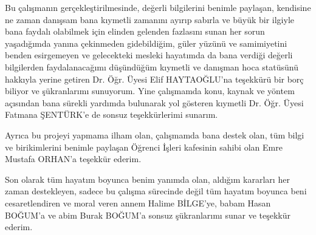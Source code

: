 Bu çalışmanın gerçekleştirilmesinde, değerli bilgilerini benimle paylaşan, kendisine ne zaman danışsam bana kıymetli zamanını ayırıp sabırla ve büyük bir ilgiyle bana faydalı olabilmek için elinden gelenden fazlasını sunan her sorun yaşadığımda yanına çekinmeden gidebildiğim, güler yüzünü ve samimiyetini benden esirgemeyen ve gelecekteki mesleki hayatımda da bana verdiği değerli bilgilerden faydalanacağımı düşündüğüm kıymetli ve danışman hoca statüsünü hakkıyla yerine getiren Dr. Öğr. Üyesi Elif HAYTAOĞLU’na teşekkürü bir borç biliyor ve şükranlarımı sunuyorum. Yine çalışmamda konu, kaynak ve yöntem açısından bana sürekli yardımda bulunarak yol gösteren kıymetli Dr. Öğr. Üyesi Fatmana ŞENTÜRK’e de sonsuz teşekkürlerimi sunarım. 

Ayrıca bu projeyi yapmama ilham olan, çalışmamda bana destek olan, tüm bilgi ve birikimlerini benimle paylaşan Öğrenci İşleri kafesinin sahibi olan Emre Mustafa ORHAN'a teşekkür ederim.

Son olarak tüm hayatım boyunca benim yanımda olan, aldığım kararları her zaman destekleyen, sadece bu çalışma sürecinde değil tüm hayatım boyunca beni cesaretlendiren ve moral veren annem Halime BİLGE'ye, babam Hasan BOĞUM'a ve abim Burak BOĞUM'a sonsuz şükranlarımı sunar ve teşekkür ederim.
    
    